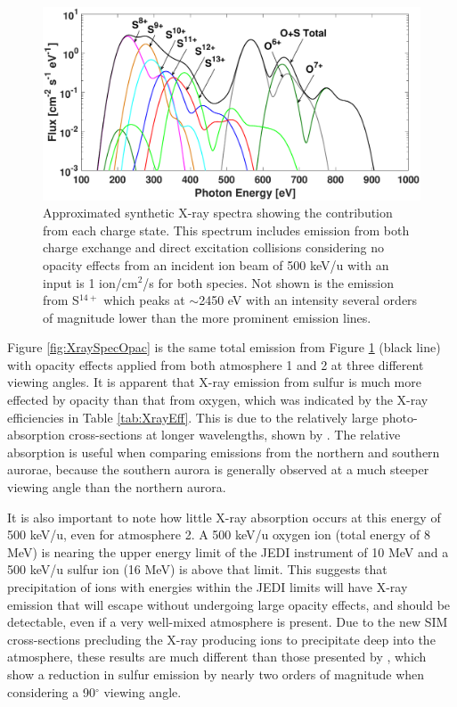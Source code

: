 \documentclass[draft]{agujournal2018}
\begin{document}
\begin{figure}
    \centering
    \includegraphics[width=\textwidth]{Figures/O+S_CX+DE_500keVNoOpacSpec.eps}
    \caption{Approximated synthetic X-ray spectra showing the contribution from each charge state. This spectrum includes emission from both charge exchange and direct excitation collisions considering no opacity effects from an incident ion beam of 500 keV/u with an input is 1 ion/cm$^2$/s for both species. Not shown is the emission from S$^{14+}$ which peaks at $\sim$2450 eV with an intensity several orders of magnitude lower than the more prominent emission lines.}
    \label{fig:XraySpec}
\end{figure}

Figure \ref{fig:XraySpecOpac} is the same total emission from Figure \ref{fig:XraySpec} (black line) with opacity effects applied from both atmosphere 1 and 2 at three different viewing angles.
It is apparent that X-ray emission from sulfur is much more effected by opacity than that from oxygen, which was indicated by the X-ray efficiencies in Table \ref{tab:XrayEff}.
This is due to the relatively large photo-absorption cross-sections at longer wavelengths, shown by \citet{cravens2006}.
The relative absorption is useful when comparing emissions from the northern and southern aurorae, because the southern aurora is generally observed at a much steeper viewing angle than the northern aurora.

It is also important to note how little X-ray absorption occurs at this energy of 500 keV/u, even for atmosphere 2.
A 500 keV/u oxygen ion (total energy of 8 MeV) is nearing the upper energy limit of the JEDI instrument of 10 MeV \citep{mauk2017ssr} and a 500 keV/u sulfur ion (16 MeV) is above that limit.
This suggests that precipitation of ions with energies within the JEDI limits will have X-ray emission that will escape without undergoing large opacity effects, and should be detectable, even if a very well-mixed atmosphere is present.
Due to the new SIM cross-sections precluding the X-ray producing ions to precipitate deep into the atmosphere, these results are much different than those presented by \citet{ozak2010}, which show a reduction in sulfur emission by nearly two orders of magnitude when considering a 90$^{\circ}$ viewing angle.
\end{document}

